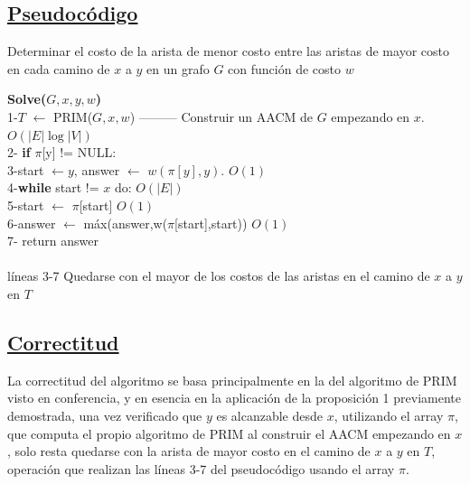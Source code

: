 \documentclass{article}
\begin{document}
    \subsection{\underline{Pseudoc\'odigo}}
    \begin{algorithm}[H]
        \caption{Determinar el costo de la arista de menor costo entre las aristas de mayor costo en cada camino de $x$ a $y$ en un grafo $G$ con funci\'on de costo $w$}
        \textbf{Solve($G,x,y,w$)\\} 
        1-\hspace*{1em}$T$ $\leftarrow$ PRIM($G,x,w$) --------- Construir un AACM de $G$ empezando en $x$. $O(|E|\log{|V|})$\\
        2-\hspace*{1em} \textbf{if} $\pi$[y] != NULL:\\
        3-\hspace*{2em}start $\leftarrow y$, answer $\leftarrow$ $w(\pi[y],y)$. $O(1)$\\ 
        4-\hspace*{2em}\textbf{while} start != $x$ do:  $O(|E|)$\\
        5-\hspace*{3em}start $\leftarrow$ $\pi$[start] $O(1)$\\
        6-\hspace*{3em}answer $\leftarrow$ m\'ax(answer,w($\pi$[start],start)) $O(1)$\\
        7-\hspace*{2em} return answer\\\\
        
        l\'ineas 3-7 Quedarse con el mayor de los costos de las aristas en el camino de $x$ a $y$ en $T$
    \end{algorithm}

    \subsection{\underline{Correctitud}}

    La correctitud del algoritmo se basa principalmente en la del algoritmo de PRIM visto en conferencia, y en esencia en 
    la aplicaci\'on de la proposici\'on 1 previamente demostrada, una vez verificado que $y$ es alcanzable desde $x$, utilizando el array 
    $\pi$, que computa el propio algoritmo de PRIM al construir el AACM empezando en $x$, solo resta quedarse con la arista de mayor costo 
    en el camino de $x$ a $y$ en $T$, operaci\'on que realizan las l\'ineas 3-7 del pseudoc\'odigo usando el array $\pi$.
\end{document}
